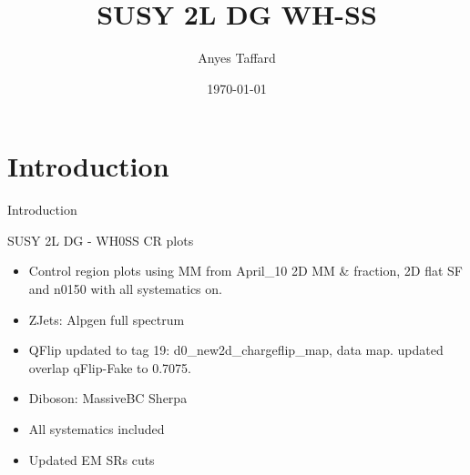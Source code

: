 \documentclass[10pt]{beamer}
\begin{document}

\newcommand{\METrel}{\ensuremath{E_\mathrm{T}^\mathrm{miss,rel}}}
\newcommand{\meff}{\ensuremath{m_{\mathrm{eff}}}}
\newcommand{\mt}{\ensuremath{m_\mathrm{T}}}
\newcommand{\pTmiss}{\ensuremath{\mathbf{p}_\mathrm{T}^\mathrm{miss}}}
\newcommand{\mll}{\ensuremath{m_{\ell\ell}}}
\newcommand{\pTll}{\ensuremath{p_\mathrm{T,\ell\ell}}}
\newcommand{\dphill}{\ensuremath{\Delta\phi_{\ell\ell}}}
\newcommand{\dRll}{\ensuremath{\Delta R_{\ell\ell}}}
\newcommand{\mjj}{\ensuremath{m_{jj}}}
\newcommand{\mljj}{\ensuremath{m_{ljj}}}


\author{Anyes Taffard}
\date{\today}

\title[SUSY 2L WH SS ]{SUSY 2L DG WH-SS}

\begin{frame}[plain]
  \titlepage
\end{frame}

\section{Introduction}
\begin{frame}{Introduction}
  \begin{block}{SUSY 2L DG - WH0SS CR plots }
    \begin{itemize}
    \item Control region plots using MM from April\_10 2D MM \& fraction, 2D flat SF and n0150 with all systematics on.
    \item ZJets: Alpgen full spectrum
    \item QFlip updated to tag 19: d0\_new2d\_chargeflip\_map, data map. updated overlap qFlip-Fake to 0.7075.
    \item Diboson: MassiveBC Sherpa
    \item All systematics included
    \item Updated EM SRs cuts
    \end{itemize}
  \end{block}
\end{frame}
\end{document}
